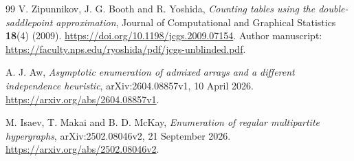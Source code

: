 \begin{thebibliography}{99}
V. Zipunnikov, J. G. Booth and R. Yoshida,
\emph{Counting tables using the double-saddlepoint approximation},
Journal of Computational and Graphical Statistics \textbf{18}(4) (2009).
\url{https://doi.org/10.1198/jcgs.2009.07154}.
Author manuscript:
\url{https://faculty.nps.edu/ryoshida/pdf/jcgs-unblinded.pdf}.

A. J. Aw,
\emph{Asymptotic enumeration of admixed arrays and a different independence heuristic},
arXiv:2604.08857v1, 10 April 2026.
\url{https://arxiv.org/abs/2604.08857v1}.

M. Isaev, T. Makai and B. D. McKay,
\emph{Enumeration of regular multipartite hypergraphs},
arXiv:2502.08046v2, 21 September 2026.
\url{https://arxiv.org/abs/2502.08046v2}.
\end{thebibliography}
